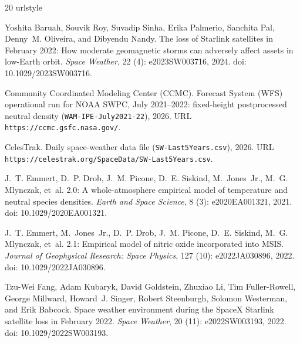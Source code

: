 \documentclass[12pt]{article}
\begin{document}
\begin{thebibliography}{20}
\providecommand{\natexlab}[1]{#1}
\providecommand{\url}[1]{\texttt{#1}}
\expandafter\ifx\csname urlstyle\endcsname\relax
  \providecommand{\doi}[1]{doi: #1}\else
  \providecommand{\doi}{doi: \begingroup \urlstyle{rm}\Url}\fi

Yoshita Baruah, Souvik Roy, Suvadip Sinha, Erika Palmerio, Sanchita Pal,
  Denny~M. Oliveira, and Dibyendu Nandy.
\newblock The loss of {Starlink} satellites in {February} 2022: How moderate
  geomagnetic storms can adversely affect assets in low-{Earth} orbit.
\newblock \emph{Space Weather}, 22 (4): e2023SW003716, 2024.
\newblock \doi{10.1029/2023SW003716}.

{Community Coordinated Modeling Center (CCMC)}.
 Forecast System (WFS) operational run for {NOAA} {SWPC},
  July 2021--2022: fixed-height postprocessed neutral density (\texttt{WAM-IPE-July2021-22}), 2026.
\newblock URL \url{https://ccmc.gsfc.nasa.gov/}.

{CelesTrak}.
\newblock Daily space-weather data file (\texttt{SW-Last5Years.csv}), 2026.
\newblock URL \url{https://celestrak.org/SpaceData/SW-Last5Years.csv}.

J.~T. Emmert, D.~P. Drob, J.~M. Picone, D.~E. Siskind, M.~Jones~Jr., M.~G.
  Mlynczak, et~al.
 2.0: A whole-atmosphere empirical model of temperature and
  neutral species densities.
\newblock \emph{Earth and Space Science}, 8 (3):
  e2020EA001321, 2021.
\newblock \doi{10.1029/2020EA001321}.

J.~T. Emmert, M.~Jones~Jr., D.~P. Drob, J.~M. Picone, D.~E. Siskind, M.~G.
  Mlynczak, et~al.
 2.1: Empirical model of nitric oxide incorporated into
  {MSIS}.
\newblock \emph{Journal of Geophysical Research: Space Physics}, 127
  (10): e2022JA030896, 2022.
\newblock \doi{10.1029/2022JA030896}.

Tzu-Wei Fang, Adam Kubaryk, David Goldstein, Zhuxiao Li, Tim Fuller-Rowell,
  George Millward, Howard~J. Singer, Robert Steenburgh, Solomon Westerman, and
  Erik Babcock.
\newblock Space weather environment during the {SpaceX} {Starlink} satellite
  loss in {February} 2022.
\newblock \emph{Space Weather}, 20 (11): e2022SW003193, 2022.
\newblock \doi{10.1029/2022SW003193}.


\end{thebibliography}
\end{document}
